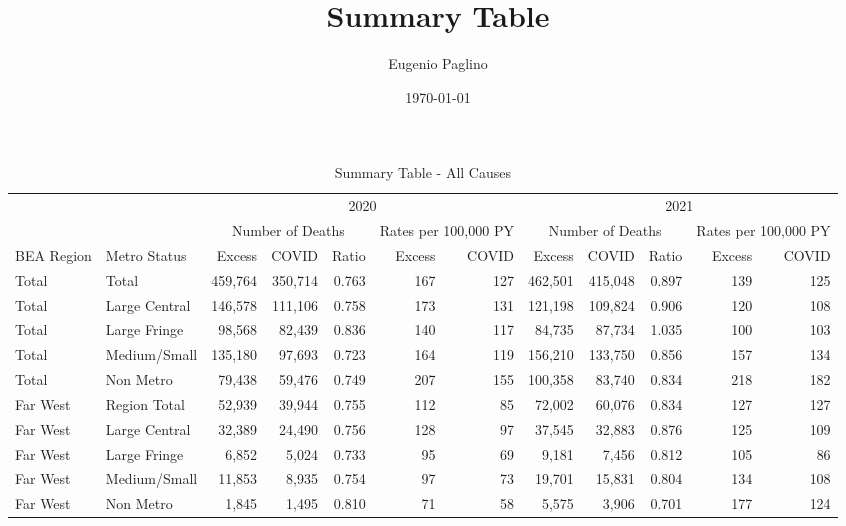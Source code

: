 \documentclass[
]{article}
\title{Summary Table}
\author{Eugenio Paglino}
\date{\today}
\begin{document}
\maketitle

\begin{table}

\caption{\label{tab:unnamed-chunk-8}Summary Table - All Causes}
\centering
\fontsize{7.5}{9.5}\selectfont
\begin{tabular}[t]{llrrrrrrrrrr}
\toprule
\multicolumn{2}{c}{ } & \multicolumn{5}{c}{2020} & \multicolumn{5}{c}{2021} \\
\cmidrule(l{3pt}r{3pt}){3-7} \cmidrule(l{3pt}r{3pt}){8-12}
\multicolumn{2}{c}{ } & \multicolumn{3}{c}{Number of Deaths} & \multicolumn{2}{c}{Rates per 100,000 PY} & \multicolumn{3}{c}{Number of Deaths} & \multicolumn{2}{c}{Rates per 100,000 PY} \\
\cmidrule(l{3pt}r{3pt}){3-5} \cmidrule(l{3pt}r{3pt}){6-7} \cmidrule(l{3pt}r{3pt}){8-10} \cmidrule(l{3pt}r{3pt}){11-12}
BEA Region & Metro Status & Excess & COVID & Ratio & Excess & COVID & Excess & COVID & Ratio & Excess & COVID\\
\midrule
Total & Total & 459,764 & 350,714 & 0.763 & 167 & 127 & 462,501 & 415,048 & 0.897 & 139 & 125\\
\addlinespace[2pt]
Total & Large Central & 146,578 & 111,106 & 0.758 & 173 & 131 & 121,198 & 109,824 & 0.906 & 120 & 108\\
Total & Large Fringe & 98,568 & 82,439 & 0.836 & 140 & 117 & 84,735 & 87,734 & 1.035 & 100 & 103\\
Total & Medium/Small & 135,180 & 97,693 & 0.723 & 164 & 119 & 156,210 & 133,750 & 0.856 & 157 & 134\\
Total & Non Metro & 79,438 & 59,476 & 0.749 & 207 & 155 & 100,358 & 83,740 & 0.834 & 218 & 182\\
\addlinespace[5pt]
Far West & Region Total & 52,939 & 39,944 & 0.755 & 112 & 85 & 72,002 & 60,076 & 0.834 & 127 & 127\\
\addlinespace[2pt]
Far West & Large Central & 32,389 & 24,490 & 0.756 & 128 & 97 & 37,545 & 32,883 & 0.876 & 125 & 109\\
Far West & Large Fringe & 6,852 & 5,024 & 0.733 & 95 & 69 & 9,181 & 7,456 & 0.812 & 105 & 86\\
Far West & Medium/Small & 11,853 & 8,935 & 0.754 & 97 & 73 & 19,701 & 15,831 & 0.804 & 134 & 108\\
Far West & Non Metro & 1,845 & 1,495 & 0.810 & 71 & 58 & 5,575 & 3,906 & 0.701 & 177 & 124\\

\end{tabular}
\end{table}
\end{document}

